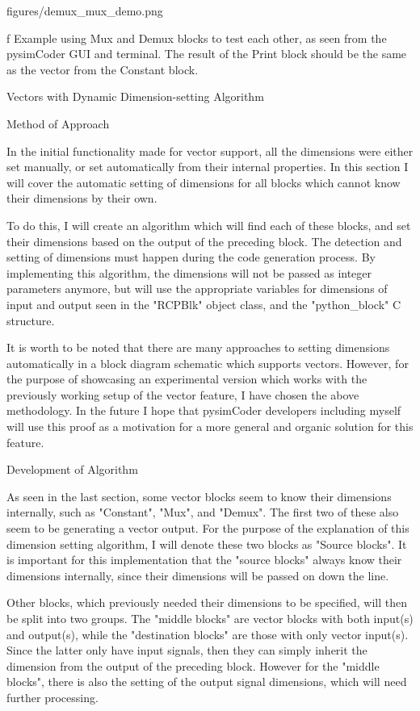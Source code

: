 \midinsert {}
\picw=14cm \cinspic figures/demux_mux_demo.png
\caption/f Example using Mux and Demux blocks to test each other, as seen from the pysimCoder GUI and
terminal. The result of the Print block should be the same as the vector from the Constant block.
\endinsert



\sec Vectors with Dynamic Dimension-setting Algorithm

\secc Method of Approach

\qquad In the initial functionality made for vector support, all the dimensions were either set manually,
or set automatically from their internal properties. In this section I will cover the automatic setting of
dimensions for all blocks which cannot know their dimensions by their own.

\quad To do this, I will create an
algorithm which will find each of these blocks, and set their dimensions based on the output of the
preceding block. The detection and setting of dimensions must happen during the code generation process.
By implementing this algorithm, the dimensions will not be passed as integer parameters anymore, but will
use the appropriate variables for dimensions of input and output seen in the "RCPBlk" object class, and the
"python_block" C structure.

\quad It is worth to be noted that there are many approaches to setting dimensions automatically in a block
diagram schematic which supports vectors. However, for the purpose of showcasing an experimental version
which works with the previously working setup of the vector feature, I have chosen the above methodology.
In the future I hope that pysimCoder developers including myself will use this proof as a motivation for
a more general and organic solution for this feature.


\secc Development of Algorithm

\qquad As seen in the last section, some vector blocks seem to know their dimensions internally, such as
"Constant", "Mux", and "Demux". The first two of these also seem to be generating a vector output. For the
purpose of the explanation of this dimension setting algorithm, I will denote these two blocks as "Source
blocks". It is important for this implementation that the "source blocks" always know their dimensions
internally, since their dimensions will be passed on down the line.

\quad Other blocks, which previously needed their dimensions to be specified, will then be split into two
groups. The "middle blocks" are vector blocks with both input(s) and output(s), while the "destination
blocks" are those with only vector input(s). Since the latter only have input signals, then they can simply
inherit the dimension from the output of the preceding block. However for the "middle blocks", there is also
the setting of the output signal dimensions, which will need further processing.

